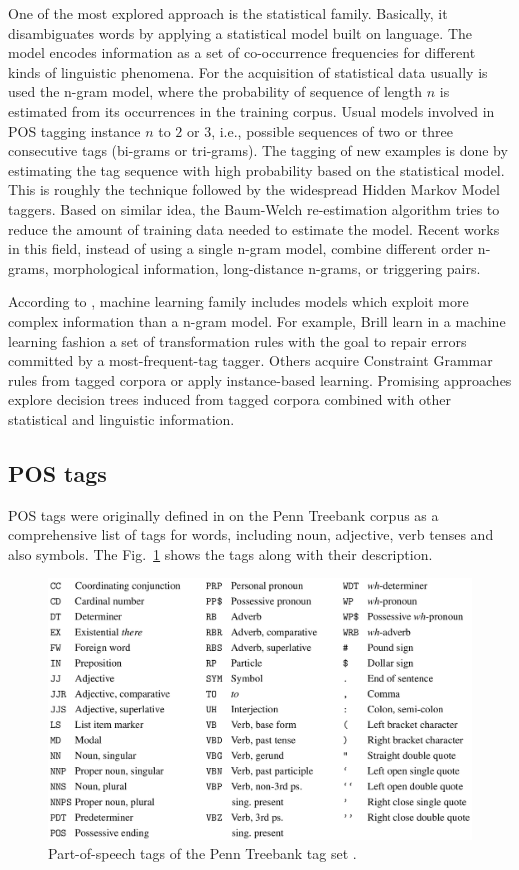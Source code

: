 One of the most explored approach is the statistical family.
Basically, it disambiguates words by applying a statistical model
built on language. The model encodes information as a set of
co-occurrence frequencies for different kinds of linguistic phenomena.
For the acquisition of statistical data usually is used the n-gram
model, where the probability of sequence of length $n$ is estimated
from its occurrences in the training corpus. Usual models involved in
POS tagging instance $n$ to $2$ or $3$, i.e., possible sequences of
two or three consecutive tags (bi-grams or tri-grams). The tagging of
new examples is done by estimating the tag sequence with high
probability based on the statistical model. This is roughly the
technique followed by the widespread Hidden Markov Model taggers.
Based on similar idea, the Baum-Welch re-estimation algorithm tries to
reduce the amount of training data needed to estimate the model.
Recent works in this field, instead of using a single n-gram model,
combine different order n-grams, morphological information,
long-distance n-grams, or triggering pairs.

According to \cite{marquez2000machine}, machine learning family
includes models which exploit more complex information than a n-gram
model. For example, Brill \etal{} learn in a machine learning fashion
a set of transformation rules with the goal to repair errors committed
by a most-frequent-tag tagger. Others acquire Constraint Grammar rules
from tagged corpora or apply instance-based learning. Promising
approaches explore decision trees induced from tagged corpora combined
with other statistical and linguistic information.

\subsection{POS tags}

POS tags were originally defined in \cite{marcus1993building} on the
Penn Treebank corpus as a comprehensive list of tags for words,
including noun, adjective, verb tenses and also symbols. The
Fig.~\ref{fig:pos-tags} shows the tags along with their description.

\begin{figure}
  \centering
  \includegraphics[width=.8\textwidth]{figures/pos-tags.png}
  \caption[Part-of-speech tags]{ Part-of-speech tags of the Penn
    Treebank tag set \cite{marcus1993building}.}
  \label{fig:pos-tags}
\end{figure}

